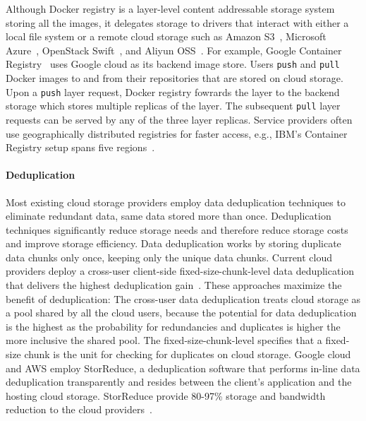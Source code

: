 



Although Docker registry is a layer-level content addressable storage system
storing all the images, it delegates storage to drivers that interact with
either a local file system or a remote cloud storage such as Amazon
S3~\cite{s3}, Microsoft Azure~\cite{azure}, OpenStack Swift~\cite{swift}, and
Aliyun OSS~\cite{aliyun}.
%
For example, Google Container Registry~\cite{GoogleContainerRegistry} uses
Google cloud as its backend image store.  Users \texttt{push} and \texttt{pull}
Docker images to and from their repositories that are stored on cloud storage.
%
Upon a \texttt{push} layer request, Docker registry fowrards the layer to the
backend storage which stores multiple replicas of the layer.
%
The subsequent \texttt{pull} layer requests can be served by any of the three
layer replicas.  Service providers often use geographically distributed
registries for faster access, e.g., IBM's Container Registry setup spans five
regions~\cite{dockerworkload}. 
%




%
%
\paragraph{Deduplication} Most existing cloud storage providers employ data
deduplication techniques to eliminate redundant data, same data stored more
than once.
%
Deduplication techniques significantly reduce storage needs and therefore
reduce storage costs and improve storage efficiency.
%
Data deduplication works by storing duplicate data chunks only once, keeping
only the unique data chunks. 
%
Current cloud providers deploy a cross-user client-side fixed-size-chunk-level
data deduplication that delivers the highest deduplication
gain~\cite{pooranian2018rare}.
%
These approaches maximize the benefit of deduplication: The cross-user data
deduplication treats cloud storage as a pool shared by all the cloud users,
because the potential for data deduplication is the highest as the probability
for redundancies and duplicates is higher the more inclusive the shared pool.
%
The fixed-size-chunk-level specifies that a fixed-size chunk is the unit for
checking for duplicates on cloud storage.
%
Google cloud and AWS employ StorReduce, a deduplication software that performs
in-line data deduplication transparently and resides between the client's
application and the hosting cloud storage.
%
StorReduce provide 80-97\% storage and bandwidth reduction to the cloud
providers~\cite{StorReduce_google}.
